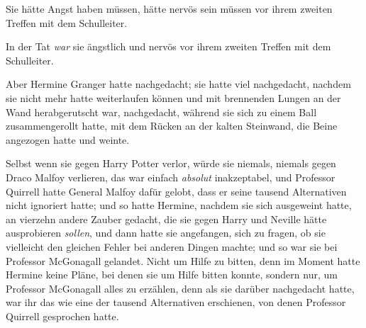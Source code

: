 Sie hätte Angst haben müssen, hätte nervös sein müssen vor ihrem zweiten Treffen mit dem Schulleiter.

In der Tat \emph{war} sie ängstlich und nervös vor ihrem zweiten Treffen mit dem Schulleiter.

Aber Hermine Granger hatte nachgedacht; sie hatte viel nachgedacht, nachdem sie nicht mehr hatte weiterlaufen können und mit brennenden Lungen an der Wand herabgerutscht war, nachgedacht, während sie sich zu einem Ball zusammengerollt hatte, mit dem Rücken an der kalten Steinwand, die Beine angezogen hatte und weinte.

Selbst wenn sie gegen Harry Potter verlor, würde sie niemals, niemals gegen Draco Malfoy verlieren, das war einfach \emph{absolut} inakzeptabel, und Professor Quirrell hatte General Malfoy dafür gelobt, dass er seine tausend Alternativen nicht ignoriert hatte; und so hatte Hermine, nachdem sie sich ausgeweint hatte, an vierzehn andere Zauber gedacht, die sie gegen Harry und Neville hätte ausprobieren \emph{sollen}, und dann hatte sie angefangen, sich zu fragen, ob sie vielleicht den gleichen Fehler bei anderen Dingen machte; und so war sie bei Professor McGonagall gelandet. Nicht um Hilfe zu bitten, denn im Moment hatte Hermine keine Pläne, bei denen sie um Hilfe bitten konnte, sondern nur, um Professor McGonagall alles zu erzählen, denn als sie darüber nachgedacht hatte, war ihr das wie eine der tausend Alternativen erschienen, von denen Professor Quirrell gesprochen hatte.

